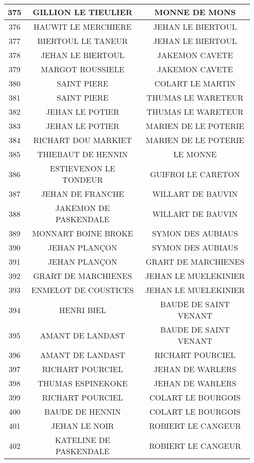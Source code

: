 \begin{center}
\begin{longtable}{|c|c|c|}
\hline	375	&	GILLION LE TIEULIER	&	MONNE DE MONS	\\
\hline	376	&	HAUWIT LE MERCHIERE	&	JEHAN LE BIERTOUL	\\
\hline	377	&	BIERTOUL LE TANEUR	&	JEHAN LE BIERTOUL	\\
\hline	378	&	JEHAN LE BIERTOUL	&	JAKEMON CAVETE	\\
\hline	379	&	MARGOT ROUSSIELE	&	JAKEMON CAVETE	\\
\hline	380	&	SAINT PIERE	&	COLART LE MARTIN	\\
\hline	381	&	SAINT PIERE	&	THUMAS LE WARETEUR	\\
\hline	382	&	JEHAN LE POTIER	&	THUMAS LE WARETEUR	\\
\hline	383	&	JEHAN LE POTIER	&	MARIEN DE LE POTERIE	\\
\hline	384	&	RICHART DOU MARKIET	&	MARIEN DE LE POTERIE	\\
\hline	385	&	THIEBAUT DE HENNIN	&	LE MONNE	\\
\hline	386	&	ESTIEVENON LE TONDEUR	&	GUIFROI LE CARETON	\\
\hline	387	&	JEHAN DE FRANCHE	&	WILLART DE BAUVIN	\\
\hline	388	&	JAKEMON DE PASKENDALE	&	WILLART DE BAUVIN	\\
\hline	389	&	MONNART BOINE BROKE	&	SYMON DES AUBIAUS	\\
\hline	390	&	JEHAN PLANÇON	&	SYMON DES AUBIAUS	\\
\hline	391	&	JEHAN PLANÇON	&	GRART DE MARCHIENES	\\
\hline	392	&	GRART DE MARCHIENES	&	JEHAN LE MUELEKINIER	\\
\hline	393	&	ENMELOT DE COUSTICES	&	JEHAN LE MUELEKINIER	\\
\hline	394	&	HENRI BIEL	&	BAUDE DE SAINT VENANT	\\
\hline	395	&	AMANT DE LANDAST	&	BAUDE DE SAINT VENANT	\\
\hline	396	&	AMANT DE LANDAST	&	RICHART POURCIEL	\\
\hline	397	&	RICHART POURCIEL	&	JEHAN DE WARLERS	\\
\hline	398	&	THUMAS ESPINEKOKE	&	JEHAN DE WARLERS	\\
\hline	399	&	RICHART POURCIEL	&	COLART LE BOURGOIS	\\
\hline	400	&	BAUDE DE HENNIN	&	COLART LE BOURGOIS	\\
\hline	401	&	JEHAN LE NOIR	&	ROBIERT LE CANGEUR	\\
\hline	402	&	KATELINE DE PASKENDALE	&	ROBIERT LE CANGEUR	\\

\end{longtable}
\end{center}
